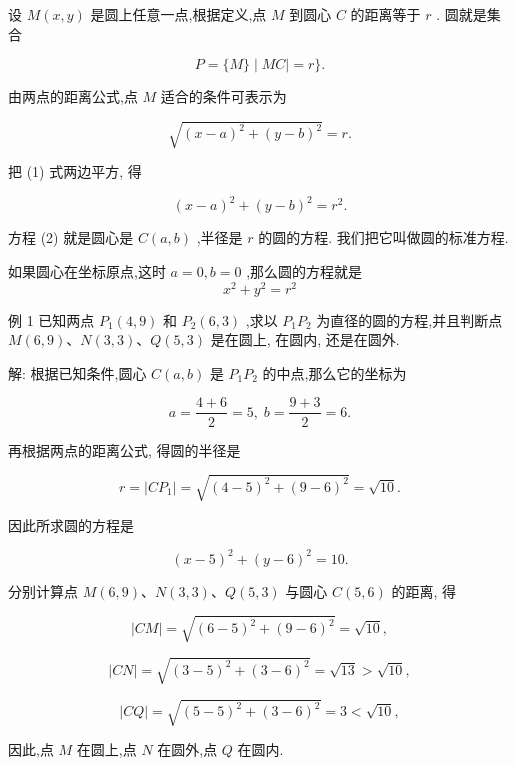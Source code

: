 \documentclass[lang=cn,newtx,10.5pt,scheme=chinese]{elegantbook}
\begin{document}
设 \(M\left( {x,y}\right)\) 是圆上任意一点,根据定义,点 \(M\) 到圆心 \(C\) 的距离等于 \(r\) . 圆就是集合

\[
  P = \{ M\} \mid {MC} \mid = r\} .
\]

由两点的距离公式,点 \(M\) 适合的条件可表示为

\[
  \sqrt{{\left( x - a\right) }^{2} + {\left( y - b\right) }^{2}} = r. \tag{1}
\]

把 (1) 式两边平方, 得

\[
    {\left( x - a\right) }^{2} + {\left( y - b\right) }^{2} = {r}^{2}. \tag{2}
\]

方程 (2) 就是圆心是 \(C\left( {a,b}\right)\) ,半径是 \(r\) 的圆的方程. 我们把它叫做圆的标准方程.
\begin{definition}[圆的标准方程]
	如果圆心在坐标原点,这时 \(a = 0,b = 0\) ,那么圆的方程就是
	\[
	{x}^{2} + {y}^{2} = {r}^{2}
	\]
\end{definition}


例 1 已知两点 \({P}_{1}\left( {4,9}\right)\) 和 \({P}_{2}\left( {6,3}\right)\) ,求以 \({P}_{1}{P}_{2}\) 为直径的圆的方程,并且判断点 \(M\left( {6,9}\right) \text{、}N\left( {3,3}\right) \text{、}Q\left( {5,3}\right)\) 是在圆上, 在圆内, 还是在圆外.

解: 根据已知条件,圆心 \(C\left( {a,b}\right)\) 是 \({P}_{1}{P}_{2}\) 的中点,那么它的坐标为

\[
  a = \frac{4 + 6}{2} = 5,\;b = \frac{9 + 3}{2} = 6.
\]

再根据两点的距离公式, 得圆的半径是

\[
  r = \left| {C{P}_{1}}\right| = \sqrt{{\left( 4 - 5\right) }^{2} + {\left( 9 - 6\right) }^{2}} = \sqrt{10}.
\]

因此所求圆的方程是

\[
    {\left( x - 5\right) }^{2} + {\left( y - 6\right) }^{2} = {10}.
\]

分别计算点 \(M\left( {6,9}\right) \text{、}N\left( {3,3}\right) \text{、}Q\left( {5,3}\right)\) 与圆心 \(C\left( {5,6}\right)\) 的距离, 得

\[
  \left| {CM}\right| = \sqrt{{\left( 6 - 5\right) }^{2} + {\left( 9 - 6\right) }^{2}} = \sqrt{10},
\]

\[
  \left| {CN}\right| = \sqrt{{\left( 3 - 5\right) }^{2} + {\left( 3 - 6\right) }^{2}} = \sqrt{13} > \sqrt{10},
\]

\[
  \left| {CQ}\right| = \sqrt{{\left( 5 - 5\right) }^{2} + {\left( 3 - 6\right) }^{2}} = 3 < \sqrt{10},
\]

因此,点 \(M\) 在圆上,点 \(N\) 在圆外,点 \(Q\) 在圆内.
\end{document}
